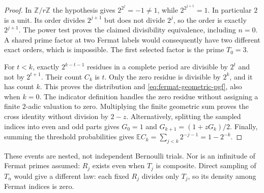 \documentclass[11pt]{article}
\theoremstyle{definition}
\begin{document}
\begin{proof}
In $\mathbb Z/r\mathbb Z$ the hypothesis gives
$2^{2^j}=-1\ne1$, while $2^{2^{j+1}}=1$.
In particular $2$ is a unit. Its order divides $2^{j+1}$ but
does not divide $2^j$, so the order is exactly $2^{j+1}$.
The power test proves the claimed divisibility equivalence,
including $n=0$. A shared prime factor at two Fermat labels
would consequently have two different exact orders, which is
impossible. The first selected factor is the prime $T_0=3$.

For $t<k$, exactly $2^{k-t-1}$ residues in a complete period
are divisible by $2^t$ and not by $2^{t+1}$.
Their count $C_k$ is $t$. Only the zero residue is divisible by
$2^k$, and it has count $k$. This proves the distribution and
\eqref{eq:fermat-geometric-pgf}, also when $k=0$.
The indicator definition handles the zero residue without assigning
a finite $2$-adic valuation to zero. Multiplying the finite
geometric sum proves the cross identity without division by $2-z$.
Alternatively, splitting the sampled indices into even and odd
parts gives $G_0=1$ and $G_{k+1}=(1+zG_k)/2$.
Finally, summing the threshold probabilities gives
$\mathbb E C_k=\sum_{j<k}2^{-j-1}=1-2^{-k}$.
\end{proof}

These events are nested, not independent Bernoulli trials.
Nor is an infinitude of Fermat primes assumed: $R_j$ exists
even when $T_j$ is composite. Direct sampling of $T_n$ would
give a different law: each fixed $R_j$ divides only $T_j$,
so its density among Fermat indices is zero.
\end{document}
